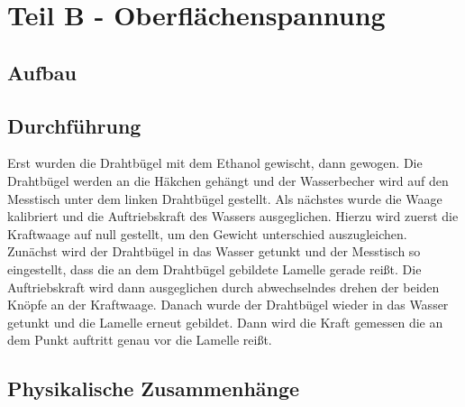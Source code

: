 \documentclass[11pt,a4paper]{article}
\begin{document}
\section{Teil B - Oberfl\"achenspannung}

\subsection{Aufbau}


\subsection{Durchführung}

Erst wurden die Drahtbügel mit dem Ethanol gewischt, dann gewogen. Die Drahtbügel werden an die Häkchen gehängt und der Wasserbecher wird auf den Messtisch unter dem linken Drahtbügel gestellt. Als nächstes wurde die Waage kalibriert und die Auftriebskraft des Wassers ausgeglichen. Hierzu wird zuerst die Kraftwaage auf null gestellt, um den Gewicht unterschied auszugleichen. Zunächst wird der Drahtbügel in das Wasser getunkt und der Messtisch so eingestellt, dass die an dem Drahtbügel gebildete Lamelle gerade reißt. Die Auftriebskraft wird dann ausgeglichen durch abwechselndes drehen der beiden Knöpfe an der Kraftwaage. Danach wurde der Drahtbügel wieder in das Wasser getunkt und die Lamelle erneut gebildet. Dann wird die Kraft gemessen die an dem Punkt auftritt genau vor die Lamelle reißt. 

\subsection{Physikalische Zusammenh\"ange}
\end{document}
